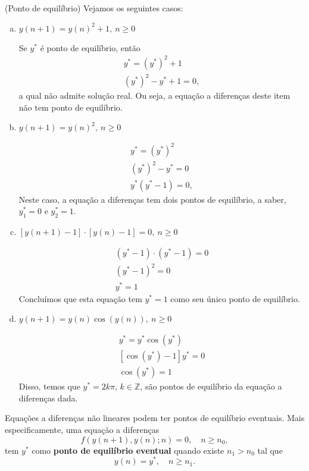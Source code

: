 \begin{ex}(Ponto de equilíbrio)
  Vejamos os seguintes casos:
  \begin{enumerate}[a)]
  \item $y(n+1) = y(n)^2+1,~n\geq 0$

    Se $y^*$ é ponto de equilíbrio, então
    \begin{gather}
      y^* = \left(y^*\right)^2 + 1 \\
      \left(y^*\right)^2 - y^* + 1 = 0,
    \end{gather}
    a qual não admite solução real. Ou seja, a equação a diferenças deste item não tem ponto de equilíbrio.

  \item $y(n+1) = y(n)^2,~n\geq 0$

    \begin{gather}
      y^* = \left(y^*\right)^2 \\
      \left(y^*\right)^2 - y^* = 0 \\
      y^*\left(y^* - 1\right) = 0,
    \end{gather}
    Neste caso, a equação a diferenças tem dois pontos de equilíbrio, a saber, $y_1^* = 0$ e $y_2^* = 1$.

  \item $\left[y(n+1)-1\right]\cdot \left[y(n)-1\right]=0,~n\geq 0$

    \begin{gather}
      \left(y^*-1\right)\cdot \left(y^*-1\right) = 0 \\
      \left(y^*-1\right)^2 = 0 \\
      y^* = 1
    \end{gather}
    Concluímos que esta equação tem $y^*=1$ como seu único ponto de equilíbrio.

  \item $y(n+1) = y(n)\cos\left(y(n)\right), ~ n\geq 0$

    \begin{gather}
      y^* = y^*\cos\left(y^*\right) \\
      \left[\cos\left(y^*\right) - 1\right]y^* = 0 \\
      \cos\left(y^*\right) = 1
    \end{gather}
    Disso, temos que $y^* = 2k\pi$, $k\in\mathbb{Z}$, são pontos de equilíbrio da equação a diferenças dada. 
  \end{enumerate}
\end{ex}

Equações a diferenças não lineares podem ter pontos de equilíbrio eventuais. Mais especificamente, uma equação a diferenças
\begin{equation}\label{eq:ead1_enl_pe_pt}
  f(y(n+1),y(n);n)=0,\quad n\geq n_0,
\end{equation}
tem $y^*$ como {\bf ponto de equilíbrio eventual} quando existe $n_1>n_0$ tal que
\begin{equation}
  y(n) = y^*,\quad n\geq n_1.
\end{equation}


